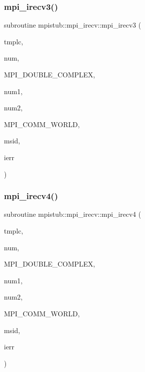 \mbox{\label{interfacempistub_1_1mpi__irecv_ac5c143155b2e07bab6a2730ab9d6000f}} 
\subsubsection{\texorpdfstring{mpi\_irecv3()}{mpi\_irecv3()}}
{\footnotesize\ttfamily subroutine mpistub\+::mpi\+\_\+irecv\+::mpi\+\_\+irecv3 (\begin{DoxyParamCaption}\item[{double complex, dimension(\+:,\+:)}]{tmplc,  }\item[{}]{num,  }\item[{}]{M\+P\+I\+\_\+\+D\+O\+U\+B\+L\+E\+\_\+\+C\+O\+M\+P\+L\+EX,  }\item[{}]{num1,  }\item[{}]{num2,  }\item[{}]{M\+P\+I\+\_\+\+C\+O\+M\+M\+\_\+\+W\+O\+R\+LD,  }\item[{}]{msid,  }\item[{}]{ierr }\end{DoxyParamCaption})}

\mbox{\label{interfacempistub_1_1mpi__irecv_aae5cbd57d43bfa9d301bcbf7b90f8973}} 
\subsubsection{\texorpdfstring{mpi\_irecv4()}{mpi\_irecv4()}}
{\footnotesize\ttfamily subroutine mpistub\+::mpi\+\_\+irecv\+::mpi\+\_\+irecv4 (\begin{DoxyParamCaption}\item[{double complex, dimension(\+:,\+:,\+:)}]{tmplc,  }\item[{}]{num,  }\item[{}]{M\+P\+I\+\_\+\+D\+O\+U\+B\+L\+E\+\_\+\+C\+O\+M\+P\+L\+EX,  }\item[{}]{num1,  }\item[{}]{num2,  }\item[{}]{M\+P\+I\+\_\+\+C\+O\+M\+M\+\_\+\+W\+O\+R\+LD,  }\item[{}]{msid,  }\item[{}]{ierr }\end{DoxyParamCaption})}

